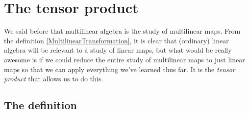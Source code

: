 \section{The tensor product}

We said before that multilinear algebra is the study of multilinear maps.  From the definition \cref{MultilinearTransformation}, it is clear that (ordinary) linear algebra will be relevant to a study of linear maps, but what would be really awesome is if we could reduce the entire study of multilinear maps to just linear maps so that we can apply everything we've learned thus far.  It is the \emph{tensor product} that allows us to do this.

\subsection{The definition}

